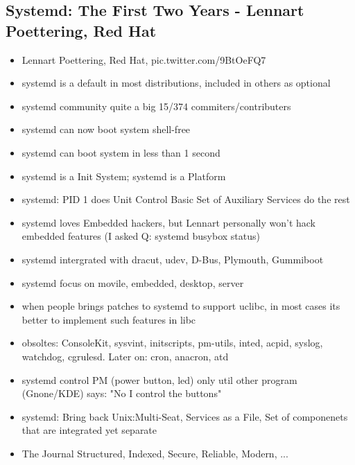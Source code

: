 \documentclass[10pt]{article}
\begin{document}
{\subsection{Systemd: The First Two Years - Lennart Poettering, Red Hat}
\begin{itemize}
\item Lennart Poettering, Red Hat,  pic.twitter.com/9BtOeFQ7
\item systemd is a default in most distributions, included in others as optional
\item systemd community quite a big 15/374 commiters/contributers
\item systemd can now boot system shell-free
\item systemd can boot system in less than 1 second
\item systemd is a Init System; systemd is a Platform
\item systemd: PID 1 does Unit Control Basic Set of Auxiliary Services do the rest
\item systemd loves Embedded hackers, but Lennart personally won't hack embedded features (I asked Q: systemd busybox status)
\item systemd intergrated with dracut, udev, D-Bus, Plymouth, Gummiboot
\item systemd focus on movile, embedded, desktop, server
\item when people brings patches to systemd to support uclibc, in most cases its better to implement such features in libc
\item obsoltes: ConsoleKit, sysvint, initscripts, pm-utils, inted, acpid, syslog, watchdog, cgrulesd. Later on: cron, anacron, atd
\item systemd control PM (power button, led) only util other program (Gnone/KDE) says: "No I control the buttons"
\item systemd: Bring back Unix:Multi-Seat, Services as a File, Set of componenets that are integrated yet separate
\item The Journal Structured, Indexed, Secure, Reliable, Modern, ...
\end{itemize}

}
\end{document}

